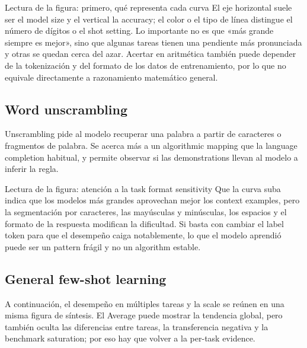 
\begin{knowledgebox}{Lectura de la figura: primero, qué representa cada curva}
El eje horizontal suele ser el model size y el vertical la accuracy; el color o el tipo de línea distingue el número de dígitos o el shot setting. Lo importante no es que «más grande siempre es mejor», sino que algunas tareas tienen una pendiente más pronunciada y otras se quedan cerca del azar. Acertar en aritmética también puede depender de la tokenización y del formato de los datos de entrenamiento, por lo que no equivale directamente a razonamiento matemático general.
\end{knowledgebox}

\subsection{Word unscrambling}

Unscrambling pide al modelo recuperar una palabra a partir de caracteres o fragmentos de palabra. Se acerca más a un algorithmic mapping que la language completion habitual, y permite observar si las demonstrations llevan al modelo a inferir la regla.


\begin{knowledgebox}{Lectura de la figura: atención a la task format sensitivity}
Que la curva suba indica que los modelos más grandes aprovechan mejor los context examples, pero la segmentación por caracteres, las mayúsculas y minúsculas, los espacios y el formato de la respuesta modifican la dificultad. Si basta con cambiar el label token para que el desempeño caiga notablemente, lo que el modelo aprendió puede ser un pattern frágil y no un algorithm estable.
\end{knowledgebox}

\subsection{General few-shot learning}

A continuación, el desempeño en múltiples tareas y la scale se reúnen en una misma figura de síntesis. El Average puede mostrar la tendencia global, pero también oculta las diferencias entre tareas, la transferencia negativa y la benchmark saturation; por eso hay que volver a la per-task evidence.

